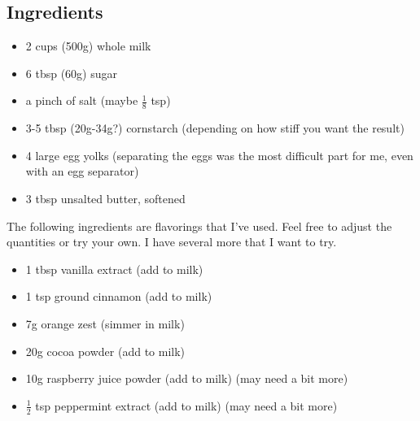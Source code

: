 \documentclass[10pt, openany]{book}
\begin{document}
\subsection{Ingredients}
\begin{itemize}
  \item 2 cups (500g) whole milk
  \item 6 tbsp (60g) sugar
  \item a pinch of salt (maybe $\frac{1}{8}$ tsp)
  \item 3-5 tbsp (20g-34g?) cornstarch (depending on how stiff you want the result)
  \item 4 large egg yolks (separating the eggs was the most difficult part for me, even with an egg separator)
  \item 3 tbsp unsalted butter, softened
\end{itemize}
The following ingredients are flavorings that I've used.  Feel free to adjust the quantities or try your own.  I have several more that I want to try.
\begin{itemize}
  \item 1 tbsp vanilla extract (add to milk)
  \item 1 tsp ground cinnamon (add to milk)
  \item 7g orange zest (simmer in milk)
  \item 20g cocoa powder (add to milk)
  \item 10g raspberry juice powder (add to milk) (may need a bit more)
  \item $\frac{1}{2}$ tsp peppermint extract (add to milk) (may need a bit more)
\end{itemize}
\end{document}
